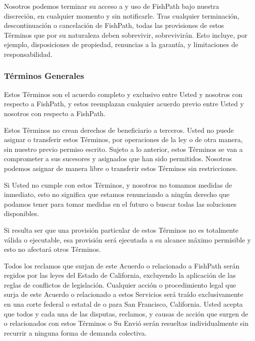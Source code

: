 \documentclass[
  11pt,
]{book}
\begin{document}
Nosotros podemos terminar su acceso a y uso de FishPath bajo nuestra discreción, en cualquier momento y sin notificarle. Tras cualquier terminación, descontinuación o cancelación de FishPath, todas las provisiones de estos Términos que por su naturaleza deben sobrevivir, sobrevivirán. Esto incluye, por ejemplo, disposiciones de propiedad, renuncias a la garantía, y limitaciones de responsabilidad.

\hypertarget{tuxe9rminos-generales}{%
\subsubsection*{Términos Generales}\label{tuxe9rminos-generales}}

Estos Términos son el acuerdo completo y exclusivo entre Usted y nosotros con respecto a FishPath, y estos reemplazan cualquier acuerdo previo entre Usted y nosotros con respecto a FishPath.

Estos Términos no crean derechos de beneficiario a terceros. Usted no puede asignar o transferir estos Términos, por operaciones de la ley o de otra manera, sin nuestro previo permiso escrito. Sujeto a lo anterior, estos Términos se van a comprometer a sus sucesores y asignados que han sido permitidos. Nosotros podemos asignar de manera libre o transferir estos Términos sin restricciones.

Si Usted no cumple con estos Términos, y nosotros no tomamos medidas de inmediato, esto no significa que estamos renunciando a ningún derecho que podamos tener para tomar medidas en el futuro o buscar todas las soluciones disponibles.

Si resulta ser que una provisión particular de estos Términos no es totalmente válida o ejecutable, esa provisión será ejecutada a su alcance máximo permisible y esto no afectará otros Términos.

Todos los reclamos que surjan de este Acuerdo o relacionado a FishPath serán regidos por las leyes del Estado de California, excluyendo la aplicación de las reglas de conflictos de legislación. Cualquier acción o procedimiento legal que surja de este Acuerdo o relacionado a estos Servicios será traído exclusivamente en una corte federal o estatal de o para San Francisco, California. Usted acepta que todos y cada una de las disputas, reclamos, y causas de acción que surgen de o relacionados con estos Términos o Su Envió serán resueltas individualmente sin recurrir a ninguna forma de demanda colectiva.
\end{document}
